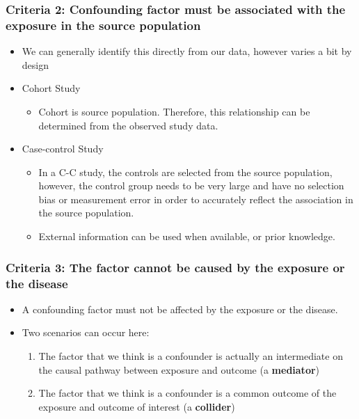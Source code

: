 \documentclass[
]{book}
\providecommand{\tightlist}{%
  \setlength{\itemsep}{0pt}\setlength{\parskip}{0pt}}
\begin{document}
\hypertarget{criteria-2-confounding-factor-must-be-associated-with-the-exposure-in-the-source-population}{%
\subsubsection{Criteria 2: Confounding factor must be associated with the exposure in the source population}\label{criteria-2-confounding-factor-must-be-associated-with-the-exposure-in-the-source-population}}

\begin{itemize}
\tightlist
\item
  We can generally identify this directly from our data, however varies a bit by design
\item
  Cohort Study

  \begin{itemize}
  \tightlist
  \item
    Cohort is source population. Therefore, this relationship can be determined from the observed study data.
  \end{itemize}
\item
  Case-control Study

  \begin{itemize}
  \tightlist
  \item
    In a C-C study, the controls are selected from the source population, however, the control group needs to be very large and have no selection bias or measurement error in order to accurately reflect the association in the source population.
  \item
    External information can be used when available, or prior knowledge.
  \end{itemize}
\end{itemize}

\hypertarget{criteria-3-the-factor-cannot-be-caused-by-the-exposure-or-the-disease}{%
\subsubsection{Criteria 3: The factor cannot be caused by the exposure or the disease}\label{criteria-3-the-factor-cannot-be-caused-by-the-exposure-or-the-disease}}

\begin{itemize}
\tightlist
\item
  A confounding factor must not be affected by the exposure or the disease.
\item
  Two scenarios can occur here:

  \begin{enumerate}
  \def\labelenumi{\arabic{enumi}.}
  \tightlist
  \item
    The factor that we think is a confounder is actually an intermediate on the causal pathway between exposure and outcome (a \textbf{mediator})
  \item
    The factor that we think is a confounder is a common outcome of the exposure and outcome of interest (a \textbf{collider})
  \end{enumerate}
\end{itemize}
\end{document}
